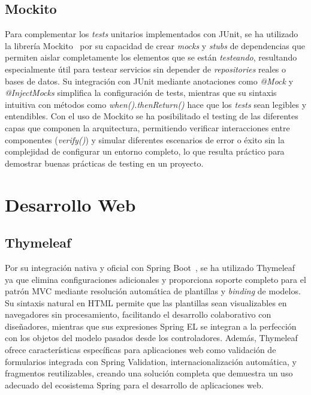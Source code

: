 \subsection{Mockito}\label{mockito}
Para complementar los \emph{tests} unitarios implementados con JUnit, se ha utilizado la librería Mockito~\cite{mockito} por su capacidad de crear \emph{mocks} y \emph{stubs} de dependencias que permiten aislar completamente los elementos que se están \emph{testeando}, resultando especialmente útil para testear servicios sin depender de \emph{repositories} reales o bases de datos. Su integración con JUnit mediante anotaciones como \emph{@Mock} y \emph{@InjectMocks} simplifica la configuración de tests, mientras que su sintaxis intuitiva con métodos como \emph{when().thenReturn()} hace que los \emph{tests} sean legibles y entendibles. Con el uso de Mockito se ha posibilitado el testing de las diferentes capas que componen la arquitectura, permitiendo verificar interacciones entre componentes (\emph{verify()}) y simular diferentes escenarios de error o éxito sin la complejidad de configurar un entorno completo, lo que resulta práctico para demostrar buenas prácticas de testing en un proyecto.

\newpage

\section{Desarrollo Web}\label{desarrollo-web}

\subsection{Thymeleaf}\label{thymeleaf}
Por su integración nativa y oficial con Spring Boot~\cite{spring-boot}, se ha utilizado Thymeleaf~\cite{thymeleaf} ya que elimina configuraciones adicionales y proporciona soporte completo para el patrón MVC mediante resolución automática de plantillas y \emph{binding} de modelos. Su sintaxis natural en HTML permite que las plantillas sean visualizables en navegadores sin procesamiento, facilitando el desarrollo colaborativo con diseñadores, mientras que sus expresiones Spring EL se integran a la perfección con los objetos del modelo pasados desde los controladores. Además, Thymeleaf ofrece características específicas para aplicaciones web como validación de formularios integrada con Spring Validation, internacionalización automática, y fragmentos reutilizables, creando una solución completa que demuestra un uso adecuado del ecosistema Spring para el desarrollo de aplicaciones web.


